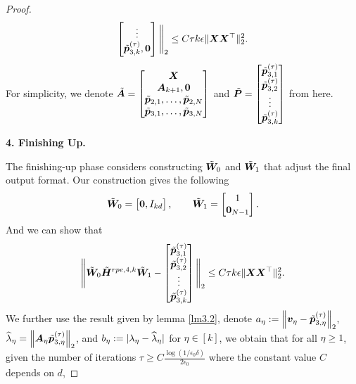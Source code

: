 \begin{proof}
\begin{align*}
\begin{bmatrix}
            \vdots\\
            \tilde{\boldsymbol{p}}_{3,k}^{(\tau)},\boldsymbol{0}
        \end{bmatrix}\Bigg\Vert_2\leq C\tau k\epsilon\Vert\boldsymbol{X}\boldsymbol{X}^\top\Vert_2^2.
    \end{align*}
    For simplicity, we denote $\tilde{\boldsymbol{A}}=\begin{bmatrix}
        \boldsymbol{X}\\
        \boldsymbol{A}_{k+1},\boldsymbol{0}\\
        \tilde{\boldsymbol{p}}_{2,1},\ldots,\tilde{\boldsymbol{p}}_{2,N}\\
        \tilde{\boldsymbol{p}}_{3,1},\ldots,\tilde{\boldsymbol{p}}_{3,N}
    \end{bmatrix}$ and $\tilde{\boldsymbol{P}}=\begin{bmatrix}
        \tilde{\boldsymbol{p}}_{3,1}^{(\tau)}\\
        \tilde{\boldsymbol{p}}_{3,2}^{(\tau)}\\
        \vdots\\
        \tilde{\boldsymbol{p}}_{3,k}^{(\tau)}
    \end{bmatrix}$ from here. 
    \begin{center}
        \textbf{4. Finishing Up.}
    \end{center}
    The finishing-up phase considers constructing $\tilde{\boldsymbol{W}}_0$ and $\tilde{\boldsymbol{W}}_1$ that adjust the final output format. Our construction gives the following 
    \begin{align*}
        \tilde{\boldsymbol{W}}_0 = \begin{bmatrix}
            \boldsymbol{0},I_{kd}
        \end{bmatrix},\qquad\tilde{\boldsymbol{W}}_1=\begin{bmatrix}
            1\\
            \boldsymbol{0}_{N-1}
        \end{bmatrix}.
    \end{align*}
    And we can show that
    \begin{align*}
        \Bigg\Vert\tilde{\boldsymbol{W}}_0\tilde{\boldsymbol{H}}^{rpe,4,k}\tilde{\boldsymbol{W}}_1-\begin{bmatrix}
            \tilde{\boldsymbol{p}}_{3,1}^{(\tau)}\\
            \tilde{\boldsymbol{p}}_{3,2}^{(\tau)}\\
            \vdots\\
            \tilde{\boldsymbol{p}}_{3,k}^{(\tau)}
        \end{bmatrix}\Bigg\Vert_2\leq C\tau k\epsilon\Vert\boldsymbol{X}\boldsymbol{X}^\top\Vert_2^2.
    \end{align*}
        We further use the result given by lemma \ref{lm3.2}, denote $a_{\eta}:=\left\Vert\boldsymbol{v}_{\eta}-\tilde{\boldsymbol{p}}_{3,\eta}^{(\tau)}\right\Vert_2$, $\widehat{\lambda}_{\eta}=\left\Vert \boldsymbol{A}_{\eta}\tilde{\boldsymbol{p}}_{3,\eta}^{(\tau)}\right\Vert_2$, and $b_{\eta}:=|\lambda_{\eta}-\widehat{\lambda}_{\eta}|$ for $\eta\in[k]$, we obtain that for all $\eta\geq 1$, given the number of iterations $\tau\geq C\frac{\log(1/\epsilon_0\delta)}{2\epsilon_0}$ where the constant value $C$ depends on $d$,

\end{proof}
